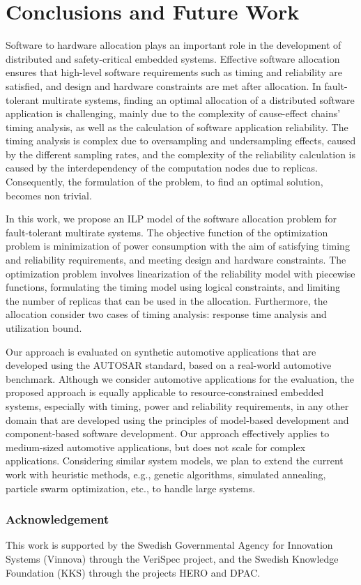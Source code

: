 \section{Conclusions and Future Work}\label{sec_conclusion}
Software to hardware allocation plays an important role in the development of distributed and safety-critical embedded systems. Effective software allocation ensures that high-level software requirements such as timing and reliability are satisfied, and design and hardware constraints are met after allocation. In fault-tolerant multirate systems, finding an optimal allocation of a distributed software application is challenging, mainly due to the complexity of cause-effect chains' timing analysis, as well as the calculation of software application reliability. The timing analysis is complex due to oversampling and undersampling effects, caused by the different sampling rates, and the complexity of the reliability calculation is caused by the interdependency of the computation nodes due to replicas. Consequently, the formulation of the problem, to find an optimal solution, becomes non trivial.

In this work, we propose an ILP model of the software allocation problem for fault-tolerant multirate systems. The objective function of the optimization problem is minimization of power consumption with the aim of satisfying timing and reliability requirements, and meeting design and hardware constraints. The optimization problem involves linearization of the reliability model with piecewise functions, formulating the timing model using logical constraints, and limiting the number of replicas that can be used in the allocation. Furthermore, the allocation consider two cases of timing analysis: response time analysis and utilization bound. 

Our approach is evaluated on synthetic automotive applications that are developed using the AUTOSAR standard, based on a real-world automotive benchmark. Although we consider automotive applications for the evaluation, the proposed approach is equally applicable to resource-constrained embedded systems, especially with timing, power and reliability requirements, in any other domain that are developed using the principles of model-based development and component-based software development. Our approach effectively applies to  medium-sized automotive applications, but does not scale for complex applications.  Considering similar system models, we plan to extend the current work with heuristic methods, e.g., genetic algorithms, simulated annealing, particle swarm optimization, etc., to handle large systems.

\subsubsection*{Acknowledgement}
This work is supported by the Swedish Governmental Agency for Innovation Systems (Vinnova) through the VeriSpec project, and the Swedish Knowledge Foundation (KKS) through the projects HERO and DPAC.